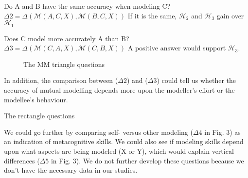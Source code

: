 \documentclass{report}
\begin{document}
Do A and B have the same accuracy when modeling C? $\Delta2 =
\Delta(\mathcal{M}(A,C,X), \mathcal{M}(B,C,X))$ If it is the same,
$\mathcal{H}_{2}$ and $\mathcal{H}_{3}$ gain over $\mathcal{H}_{1}$

Does C model more accurately A than B? $\Delta3= \Delta(\mathcal{M}(C,A,X),
\mathcal{M}(C,B,X))$ A positive answer would support $\mathcal{H}_{3}$.

\begin{figure}[htb]
\centering
{}
\caption{The MM triangle questions}

\label{mm_triangle}
\end{figure}



In addition, the comparison between ($\Delta2$) and ($\Delta3$) could tell us
whether the accuracy of mutual modelling depends more upon the modeller's effort
or the modellee's behaviour.

The rectangle questions 

We could go further by comparing self- versus other modeling ($\Delta4$ in Fig.
3) as an indication of metacognitive skills. We could also see if modeling
skills depend upon what aspects are being modeled (X or Y), which would explain
vertical differences ($\Delta5$ in Fig. 3). We do not further develop these
questions because we don’t have the necessary data in our studies.
\end{document}
